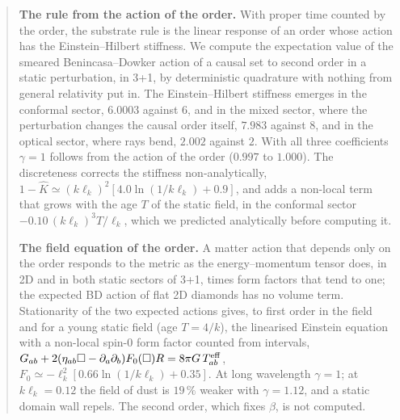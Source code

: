\begin{abstract}
\smallskip\noindent
\textbf{The rule from the action of the order.} With proper time counted by the order, the substrate
rule is the linear response of an order whose action has the Einstein--Hilbert stiffness. We compute
the expectation value of the smeared Benincasa--Dowker action of a causal set to second order in a
static perturbation, in 3+1, by deterministic quadrature with nothing from general relativity put in.
The Einstein--Hilbert stiffness emerges in the conformal sector, $6.0003$ against $6$, and in the mixed
sector, where the perturbation changes the causal order itself, $7.983$ against $8$, and in the optical
sector, where rays bend, $2.002$ against $2$. With all three coefficients $\gamma=1$ follows from the action of
the order ($0.997$ to $1.000$). The discreteness corrects the stiffness non-analytically, $1-\hat K\simeq(k\ell_k)^2[4.0\ln(1/k\ell_k)+0.9]$, and adds a
non-local term that grows with the age $T$ of the static field, in the conformal sector
$-0.10\,(k\ell_k)^3T/\ell_k$, which we predicted analytically before computing it.

\smallskip\noindent
\textbf{The field equation of the order.} A matter action that depends only on the order responds to the metric
as the energy--momentum tensor does, in 2D and in both static sectors of 3+1, times form factors that tend to one;
the expected BD action of flat 2D diamonds has no volume term. Stationarity of the two expected actions gives, to
first order in the field and for a young static field (age $T=4/k$), the linearised Einstein
equation with a non-local spin-0 form factor counted from intervals,
$G_{ab}+2(\eta_{ab}\Box-\partial_a\partial_b)F_0(\Box)R=8\pi G\,T^{\rm eff}_{ab}$,
$F_0\simeq-\ell_k^2[0.66\ln(1/k\ell_k)+0.35]$. At long wavelength $\gamma=1$; at $k\ell_k=0.12$ the field of dust
is $19\,\%$ weaker with $\gamma=1.12$, and a static domain wall repels. The second order, which fixes $\beta$, is
not computed.


\end{abstract}
